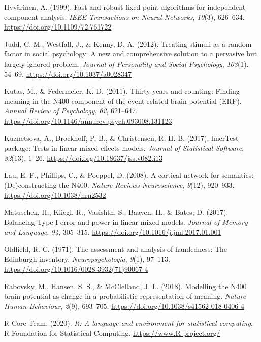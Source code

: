 \documentclass[
  english,
  man,11pt,floatsintext]{apa7}
\newlength{\cslhangindent}
\newenvironment{cslreferences}%
  {\setlength{\parindent}{0pt}%
  \everypar{\setlength{\hangindent}{\cslhangindent}}\ignorespaces}%
  {\par}
\begin{document}
\begin{cslreferences}
\leavevmode\hypertarget{ref-hyvuxe4rinen1999}{}%
Hyvärinen, A. (1999). Fast and robust fixed-point algorithms for independent component analysis. \emph{IEEE Transactions on Neural Networks}, \emph{10}(3), 626--634. \url{https://doi.org/10.1109/72.761722}

\leavevmode\hypertarget{ref-judd2012}{}%
Judd, C. M., Westfall, J., \& Kenny, D. A. (2012). Treating stimuli as a random factor in social psychology: A new and comprehensive solution to a pervasive but largely ignored problem. \emph{Journal of Personality and Social Psychology}, \emph{103}(1), 54--69. \url{https://doi.org/10.1037/a0028347}

\leavevmode\hypertarget{ref-kutas2011}{}%
Kutas, M., \& Federmeier, K. D. (2011). Thirty years and counting: Finding meaning in the N400 component of the event-related brain potential (ERP). \emph{Annual Review of Psychology}, \emph{62}, 621--647. \url{https://doi.org/10.1146/annurev.psych.093008.131123}

\leavevmode\hypertarget{ref-R-lmerTest}{}%
Kuznetsova, A., Brockhoff, P. B., \& Christensen, R. H. B. (2017). lmerTest package: Tests in linear mixed effects models. \emph{Journal of Statistical Software}, \emph{82}(13), 1--26. \url{https://doi.org/10.18637/jss.v082.i13}

\leavevmode\hypertarget{ref-lau2008}{}%
Lau, E. F., Phillips, C., \& Poeppel, D. (2008). A cortical network for semantics: (De)constructing the N400. \emph{Nature Reviews Neuroscience}, \emph{9}(12), 920--933. \url{https://doi.org/10.1038/nrn2532}

\leavevmode\hypertarget{ref-matuschek2017}{}%
Matuschek, H., Kliegl, R., Vasishth, S., Baayen, H., \& Bates, D. (2017). Balancing Type I error and power in linear mixed models. \emph{Journal of Memory and Language}, \emph{94}, 305--315. \url{https://doi.org/10.1016/j.jml.2017.01.001}

\leavevmode\hypertarget{ref-oldfield1971}{}%
Oldfield, R. C. (1971). The assessment and analysis of handedness: The Edinburgh inventory. \emph{Neuropsychologia}, \emph{9}(1), 97--113. \url{https://doi.org/10.1016/0028-3932(71)90067-4}

\leavevmode\hypertarget{ref-rabovsky2018}{}%
Rabovsky, M., Hansen, S. S., \& McClelland, J. L. (2018). Modelling the N400 brain potential as change in a probabilistic representation of meaning. \emph{Nature Human Behaviour}, \emph{2}(9), 693--705. \url{https://doi.org/10.1038/s41562-018-0406-4}

\leavevmode\hypertarget{ref-R-base}{}%
R Core Team. (2020). \emph{R: A language and environment for statistical computing}. R Foundation for Statistical Computing. \url{https://www.R-project.org/}


\end{cslreferences}
\end{document}
